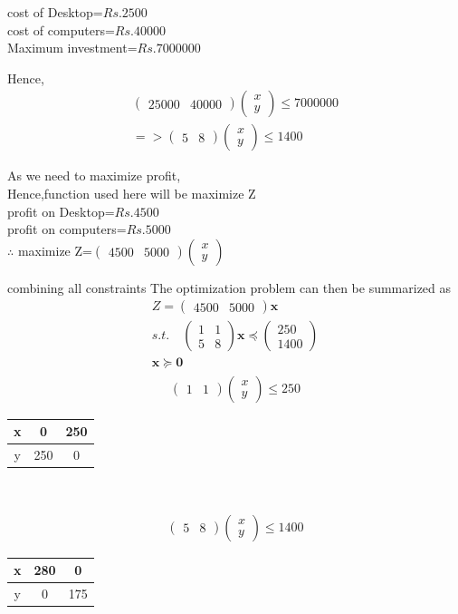 \documentclass[10pt, a4paper]{article}
\let\vec\mathbf
\newcommand{\myvec}[1]{\ensuremath{\begin{pmatrix}#1\end{pmatrix}}}
\begin{document}
\begin{center}
\begin{center}
	cost of Desktop=$Rs.2500$\\
	cost of computers=$Rs.40000$\\
	Maximum investment=$Rs.7000000$\\
\end{center}
Hence,
\begin{align}
 \myvec{25000&40000}\myvec{x\\y} \le 7000000 \\
=>\myvec{5&8}\myvec{x\\y} \le 1400 
\end{align}
\begin{center}
 As we need to maximize profit,\\
Hence,function used here will be maximize Z\\
	profit on Desktop=$Rs.4500$\\
	profit on computers=$Rs.5000$\\
	$\therefore$ maximize Z=$\myvec{4500&5000}\myvec{x\\y}$\\ 
\end{center}
combining all constraints
\fi
The optimization problem can then be summarized as
\begin{align}
Z=\myvec{4500&5000}\vec{x}
\\
 s.t. \quad \myvec{1&1\\5&8}\vec{x} \preceq \myvec{250\\1400} \\
 \vec{x} \succeq \vec{0}
\end{align}
\iffalse
\begin{align}
 \myvec{1&1}\myvec{x\\y} \le 250 
\end{align}
\begin{center}
\begin{tabular}{|c|c|c|}
	\hline
	x&0&250\\
	\hline
	y&250&0\\
	\hline
\end{tabular}\\
\end{center}
\begin{align}
 \myvec{5&8}\myvec{x\\y} \le 1400 
\end{align}
\begin{center}
\begin{tabular}{|c|c|c|}
	\hline
	x&280&0\\
	\hline
	y&0&175\\

\end{tabular}
\end{center}
\end{center}
\end{document}
